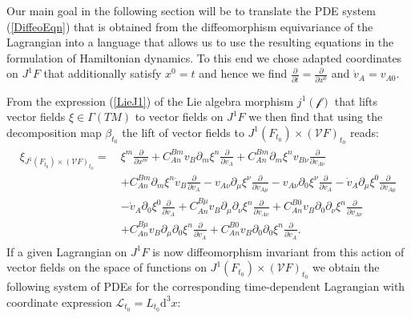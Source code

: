 Our main goal in the following section will be to translate the PDE system (\ref{DiffeoEqn}) that is obtained from the diffeomorphism equivariance of the Lagrangian into a language that allows us to use the resulting equations in the formulation of Hamiltonian dynamics. To this end we chose adapted coordinates on $J^1F$ that additionally satisfy $x^0 = t$ and hence we find $\frac{\partial}{\partial t} = \frac{\partial}{\partial x^0}$ and $\dot{v}_A = v_{A0}$. 

From the expression (\ref{LieJ1}) of the Lie algebra morphism $j^1(\mathcal{f})$ that lifts vector fields $\xi \in \Gamma(TM)$ to vector fields on $J^1F$ we then find that using the decomposition map $\beta_{t_0}$ the lift of vector fields to $J^1(F_{t_0}) \times (\mathcal{V}F)_{t_0}$ reads:
\begin{align}\label{LieJ1Dec}
\begin{aligned}
    \xi_{J^1(F_{t_0}) \times (\mathcal{V}F)_{t_0}} = \ &\xi^m \frac{\partial}{\partial x^m} + C_{An}^{Bm} v_B \partial_{m} \xi ^n \frac{\partial}{\partial v_A}
    + C_{An}^{Bm} \partial_{m} \xi^n v_{B\nu} \frac{\partial}{\partial v_{A\nu}}\\
    &+ C_{An}^{Bm} \partial_{m} \xi^n \dot{v}_{B} \frac{\partial}{\partial \dot{v}_A} - v_{A\nu} \partial_{\mu} \xi^{\nu} \frac{\partial}{\partial v_{A\mu}} 
     - v_{A\nu} \partial_{0} \xi^{\nu} \frac{\partial}{\partial \dot{v}_{A}} 
    - \dot{v}_{A} \partial_{\mu} \xi^{0} \frac{\partial}{\partial v_{A\mu}}\\
     &- \dot{v}_{A} \partial_{0} \xi^{0} \frac{\partial}{\partial \dot{v}_{A}}
    + C_{An}^{B\mu} v_B \partial_{\mu} \partial_{\nu} \xi^n \frac{\partial}{\partial v_{A\nu}}
    + C_{An}^{B0} v_B \partial_{0} \partial_{\nu} \xi^n \frac{\partial}{\partial v_{A\nu}}\\
    &+ C_{An}^{B\mu} v_B \partial_{\mu} \partial_{0} \xi^n \frac{\partial}{\partial \dot{v}_{A}}
    + C_{An}^{B0} v_B \partial_{0} \partial_{0} \xi^n \frac{\partial}{\partial \dot{v}_{A}}.
\end{aligned}
\end{align}
If a given Lagrangian on $J^1F$ is now diffeomorphism invariant from this action of vector fields on the space of functions on $J^1(F_{t_0}) \times (\mathcal{V}F)_{t_0}$ we obtain the following system of PDEs for the corresponding time-dependent Lagrangian with coordinate expression $\mathcal{L}_{t_0} = L_{t_0}\mathrm{d}^3x$:
